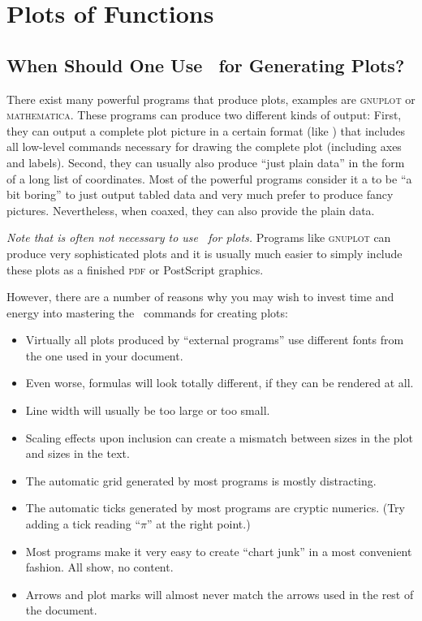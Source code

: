 %
%
%


\section{Plots of Functions}

\label{section-tikz-plots}

\subsection{When Should One Use \tikzname\ for Generating Plots? }

\label{section-why-pgname-for-plots}

There exist many powerful programs that produce plots, examples are
\textsc{gnuplot} or \textsc{mathematica}. These programs can produce
two different kinds of output: First, they can output a complete plot
picture in a certain format (like \pdf) that includes all low-level
commands necessary for drawing the complete plot (including axes and
labels). Second, they can usually also produce ``just plain data'' in
the form of a long list of coordinates. Most of the powerful programs
consider it a to be ``a bit boring'' to just output tabled data and
very much prefer to produce fancy pictures. Nevertheless, when coaxed,
they can also provide the plain data.

\emph{Note that is often not necessary to use \tikzname\ for plots.}
Programs like \textsc{gnuplot} can produce very sophisticated plots
and it is usually much easier to simply include these plots as a
finished \textsc{pdf} or PostScript graphics.

However, there are a number of reasons why you may wish to invest time
and energy into mastering the \pgfname\ commands for creating plots:

\begin{itemize}
\item
  Virtually all plots produced by ``external programs'' use different
  fonts from the one used in your document.
\item
  Even worse, formulas will look totally different, if they can be
  rendered at all.
\item
  Line width will usually be too large or too small.
\item
  Scaling effects upon inclusion can create a mismatch between sizes
  in the plot and sizes in the text.
\item
  The automatic grid generated by most programs is mostly
  distracting. 
\item
  The automatic ticks generated by most programs are cryptic
  numerics. (Try adding a tick reading ``$\pi$'' at the right point.)
\item
  Most programs make it very easy to create ``chart junk'' in a most
  convenient fashion.  All show, no content.
\item
  Arrows and plot marks will almost never match the arrows used in the
  rest of the document.
\end{itemize}

